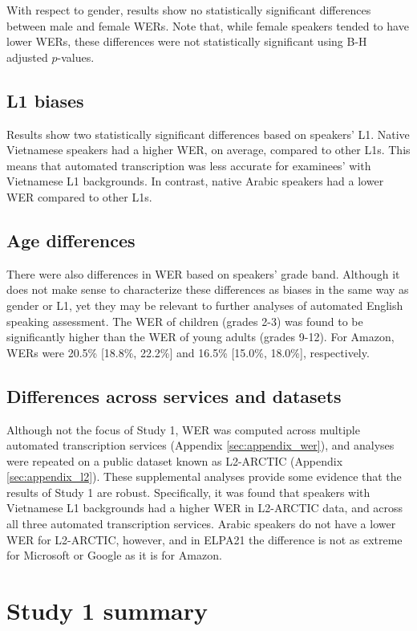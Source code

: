 \documentclass [PhD] {uclathes}
\begin{document}
With respect to gender, results show no statistically significant differences between male and female WERs. Note that, while female speakers tended to have lower WERs, these differences were not statistically significant using B-H adjusted $p$-values.

\subsection{L1 biases}

Results show two statistically significant differences based on speakers’ L1. Native Vietnamese speakers had a higher WER, on average, compared to other L1s. This means that automated transcription was less accurate for examinees' with Vietnamese L1 backgrounds. In contrast, native Arabic speakers had a lower WER compared to other L1s. 

\subsection{Age differences}

There were also differences in WER based on speakers' grade band. Although it does not make sense to characterize these differences as biases in the same way as gender or L1, yet they may be relevant to further analyses of automated English speaking assessment. The WER of children (grades 2-3) was found to be significantly higher than the WER of young adults (grades 9-12). For Amazon, WERs were 20.5\% [18.8\%, 22.2\%] and 16.5\% [15.0\%, 18.0\%], respectively.

\subsection{Differences across services and datasets}

Although not the focus of Study 1, WER was computed across multiple automated transcription services (Appendix \ref{sec:appendix_wer}), and analyses were repeated on a public dataset known as L2-ARCTIC (Appendix \ref{sec:appendix_l2}). These supplemental analyses provide some evidence that the results of Study 1 are robust. Specifically, it was found that speakers with Vietnamese L1 backgrounds had a higher WER in L2-ARCTIC data, and across all three automated transcription services. Arabic speakers do not have a lower WER for L2-ARCTIC, however, and in ELPA21 the difference is not as extreme for Microsoft or Google as it is for Amazon. 

\section{Study 1 summary}
\end{document}
